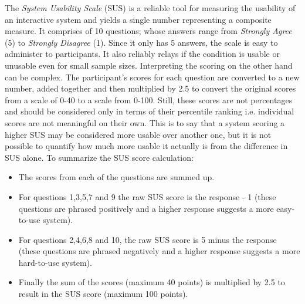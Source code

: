The \textit{System Usability Scale} (SUS) is a reliable tool for measuring the usability of an interactive system and yields a single number representing a composite measure.
It comprises of 10 questions; whose answers range from \textit{Strongly Agree} (5) to \textit{Strongly Disagree} (1).
Since it only has 5 answers, the scale is easy to administer to participants.
It also reliably relays if the condition is usable or unusable even for small sample sizes.
Interpreting the scoring on the other hand can be complex.
The participant’s scores for each question are converted to a new number, added together and then multiplied by 2.5 to convert the original scores from a scale of 0-40 to a scale from 0-100.
Still, these scores are not percentages and should be considered only in terms of their percentile ranking i.e. individual scores are not meaningful on their own.
This is to say that a system scoring a higher SUS may be considered more usable over another one, but it is not possible to quantify how much more usable it actually is from the difference in SUS alone.
To summarize the SUS score calculation:
\begin{itemize}
\item The scores from each of the questions are summed up.
\item For questions 1,3,5,7 and 9 the raw SUS score is the response - 1 (these questions are phrased positively and a higher response suggests a more easy-to-use system).
\item For questions 2,4,6,8 and 10, the raw SUS score is 5 minus the response (these questions are phrased negatively and a higher response suggests a more hard-to-use system).
\item Finally the sum of the scores (maximum 40 points) is multiplied by 2.5 to result in the SUS score (maximum 100 points).
\end{itemize}

